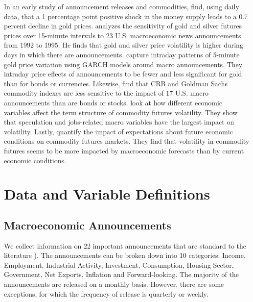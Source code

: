 \documentclass[12pt]{article}
\begin{document}
In an early study of announcement releases and commodities, \citet{frankel1985commodity}  find, using daily data, that a 1 percentage point positive shock in the money supply leads to a 0.7 percent decline in gold prices. \citet{christie2000macroeconomics} analyzes the sensitivity of gold and silver futures prices over 15-minute intervals to 23 U.S. macroeconomic news announcements from 1992 to 1995. He finds that gold and silver price volatility is higher during days in which there are announcements. \citet{cai2001moves} capture intraday patterns of 5-minute gold price variation using GARCH models around macro announcements. They intraday price effects of announcements to be fewer and less significant for gold than for bonds or currencies.  Likewise, \citet{hess2008commodity} find that CRB and Goldman Sachs commodity indexes are less sensitive to the impact of 17 U.S. macro announcements than are bonds or stocks.
 \citet{hollstein2020volatility} look at how different economic variables affect the term structure of commodity futures volatility. They show that speculation and jobs-related macro variables have the largest impact on volatility. Lastly, \citet{ye2021macroeconomic} quantify the impact of expectations about future economic conditions on commodity futures markets. They find that volatility in commodity futures seems to be more impacted by macroeconomic forecasts than by current economic conditions. 

\section{Data and Variable Definitions}


\subsection{Macroeconomic Announcements}
 
We collect information on 22 important announcements that are standard to the literature   \citep[see e.g.][]{kurov2019price}). The announcements can be broken down into 10 categories: Income, Employment, Industrial Activity, Investment, Consumption, Housing Sector, Government, Net Exports, Inflation and Forward-looking. The majority of the announcements are released on a monthly basis. However, there are some exceptions, for which the frequency of release is quarterly or weekly. 
\end{document}
